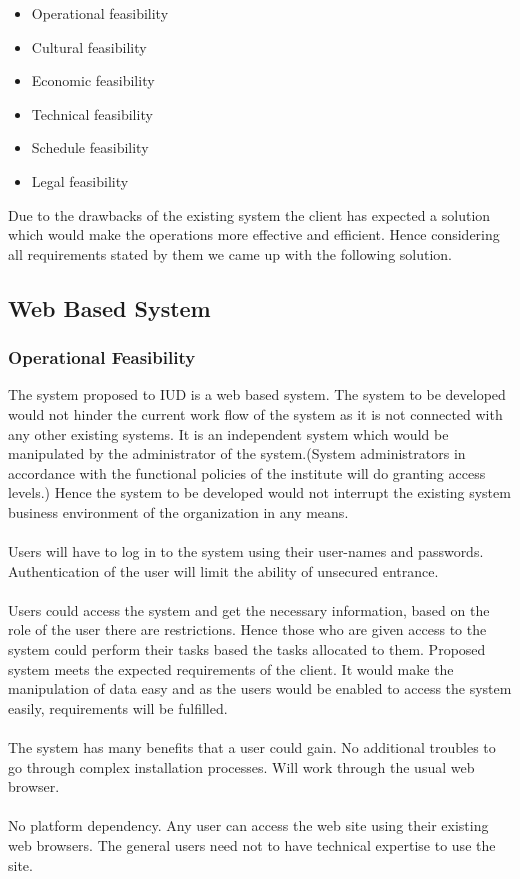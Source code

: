 \documentclass[a4paper,beamer]{article}
\begin{document}
	\begin{itemize}
		\item Operational feasibility
		\item Cultural feasibility
		\item Economic feasibility
		\item Technical feasibility
		\item Schedule feasibility
		\item Legal feasibility
	\end{itemize}
	
	Due to the drawbacks of the existing system the client has expected a solution which would make the operations more effective and efficient. Hence considering all requirements stated by them we came up with the following solution.
	
	\subsection{Web Based System}
	\subsubsection{Operational Feasibility}
	The system proposed to IUD is a web based system. The system to be developed would not hinder the current work flow of the system as it is not connected with any other existing systems. It is an independent system which would be manipulated by the administrator of the system.(System administrators in accordance with the functional policies of the institute will do granting access levels.) Hence the system to be developed would not interrupt the existing system business environment of the organization in any means.\\\\
	Users will have to log in to the system using their user-names and passwords. Authentication of the user will limit the ability of unsecured entrance.\\\\
	Users could access the system and get the necessary information, based on the role of the user there are restrictions. Hence those who are given access to the system could perform their tasks based the tasks allocated to them.
	Proposed system meets the expected requirements of the client. It would make the manipulation of data easy and as the users would be enabled to access the system easily, requirements will be fulfilled.\\\\
	The system has many benefits that a user could gain.
	No additional troubles to go through complex installation processes. Will work through the usual web browser.\\\\
	No platform dependency. Any user can access the web site using their existing web browsers. The general users need not to have technical expertise to use the site.
	
\end{document}
